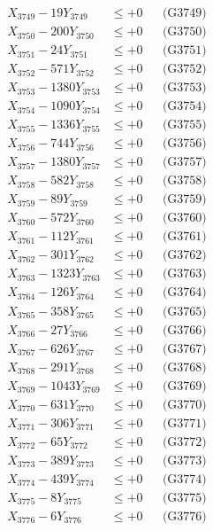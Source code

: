 \documentclass[a4paper,10pt]{article}
\begin{document}
{\begin{align}
X_{3749} - 19Y_{3749} &\leq +0 && \text{(G3749)} \\
X_{3750} - 200Y_{3750} &\leq +0 && \text{(G3750)} \\
\allowbreak
X_{3751} - 24Y_{3751} &\leq +0 && \text{(G3751)} \\
X_{3752} - 571Y_{3752} &\leq +0 && \text{(G3752)} \\
X_{3753} - 1380Y_{3753} &\leq +0 && \text{(G3753)} \\
X_{3754} - 1090Y_{3754} &\leq +0 && \text{(G3754)} \\
X_{3755} - 1336Y_{3755} &\leq +0 && \text{(G3755)} \\
X_{3756} - 744Y_{3756} &\leq +0 && \text{(G3756)} \\
X_{3757} - 1380Y_{3757} &\leq +0 && \text{(G3757)} \\
X_{3758} - 582Y_{3758} &\leq +0 && \text{(G3758)} \\
X_{3759} - 89Y_{3759} &\leq +0 && \text{(G3759)} \\
X_{3760} - 572Y_{3760} &\leq +0 && \text{(G3760)} \\
\allowbreak
X_{3761} - 112Y_{3761} &\leq +0 && \text{(G3761)} \\
X_{3762} - 301Y_{3762} &\leq +0 && \text{(G3762)} \\
X_{3763} - 1323Y_{3763} &\leq +0 && \text{(G3763)} \\
X_{3764} - 126Y_{3764} &\leq +0 && \text{(G3764)} \\
X_{3765} - 358Y_{3765} &\leq +0 && \text{(G3765)} \\
X_{3766} - 27Y_{3766} &\leq +0 && \text{(G3766)} \\
X_{3767} - 626Y_{3767} &\leq +0 && \text{(G3767)} \\
X_{3768} - 291Y_{3768} &\leq +0 && \text{(G3768)} \\
X_{3769} - 1043Y_{3769} &\leq +0 && \text{(G3769)} \\
X_{3770} - 631Y_{3770} &\leq +0 && \text{(G3770)} \\
\allowbreak
X_{3771} - 306Y_{3771} &\leq +0 && \text{(G3771)} \\
X_{3772} - 65Y_{3772} &\leq +0 && \text{(G3772)} \\
X_{3773} - 389Y_{3773} &\leq +0 && \text{(G3773)} \\
X_{3774} - 439Y_{3774} &\leq +0 && \text{(G3774)} \\
X_{3775} - 8Y_{3775} &\leq +0 && \text{(G3775)} \\
X_{3776} - 6Y_{3776} &\leq +0 && \text{(G3776)} \\

\end{align}}
\end{document}
